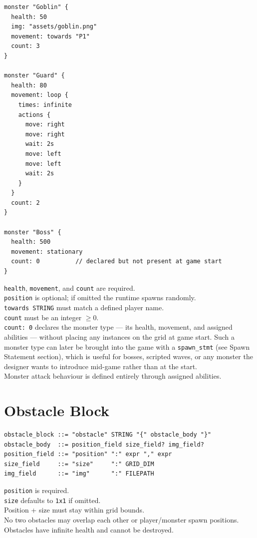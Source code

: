 \documentclass[12pt,a4paper]{article}
\begin{document}
\begin{lstlisting}[style=dsl]
monster "Goblin" {
  health: 50
  img: "assets/goblin.png"
  movement: towards "P1"
  count: 3
}

monster "Guard" {
  health: 80
  movement: loop {
    times: infinite
    actions {
      move: right
      move: right
      wait: 2s
      move: left
      move: left
      wait: 2s
    }
  }
  count: 2
}

monster "Boss" {
  health: 500
  movement: stationary
  count: 0          // declared but not present at game start
}
\end{lstlisting}

\begin{cbox}
\texttt{health}, \texttt{movement}, and \texttt{count} are required.\\
\texttt{position} is optional; if omitted the runtime spawns randomly.\\
\texttt{towards STRING} must match a defined player name.\\
\texttt{count} must be an integer $\geq 0$.\\
\texttt{count: 0} declares the monster type --- its health, movement,
and assigned abilities --- without placing any instances on the grid
at game start. Such a monster type can later be brought into the game
with a \texttt{spawn\_stmt} (see Spawn Statement section), which is
useful for bosses, scripted waves, or any monster the designer wants
to introduce mid-game rather than at the start.\\
Monster attack behaviour is defined entirely through assigned abilities.
\end{cbox}

\section{Obstacle Block}

\begin{lstlisting}[style=bnf]
obstacle_block ::= "obstacle" STRING "{" obstacle_body "}"
obstacle_body  ::= position_field size_field? img_field?
position_field ::= "position" ":" expr "," expr
size_field     ::= "size"     ":" GRID_DIM
img_field      ::= "img"      ":" FILEPATH
\end{lstlisting}

\begin{cbox}
\texttt{position} is required.\\
\texttt{size} defaults to \texttt{1x1} if omitted.\\
Position + size must stay within grid bounds.\\
No two obstacles may overlap each other or player/monster spawn positions.\\
Obstacles have infinite health and cannot be destroyed.
\end{cbox}
\end{document}
